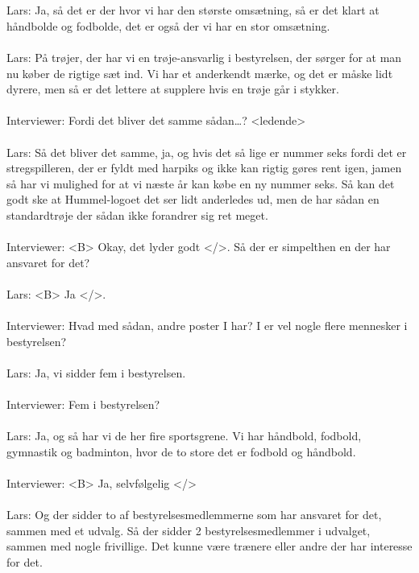 \\\\
Lars: Ja, så det er der hvor vi har den største omsætning, så er det klart at håndbolde og fodbolde, det er også der vi har en stor omsætning.
\\\\
Lars: På trøjer, der har vi en trøje-ansvarlig i bestyrelsen, der sørger for at man nu køber de rigtige sæt ind. Vi har et anderkendt mærke, og det er måske lidt dyrere, men så er det lettere at supplere hvis en trøje går i stykker.
\\\\
Interviewer: Fordi det bliver det samme sådan…? <ledende>
\\\\
Lars: Så det bliver det samme, ja, og hvis det så lige er nummer seks fordi det er stregspilleren, der er fyldt med harpiks og ikke kan rigtig gøres rent igen, jamen så har vi mulighed for at vi næste år kan købe en ny nummer seks. Så kan det godt ske at Hummel-logoet det ser lidt anderledes ud, men de har sådan en standardtrøje der sådan ikke forandrer sig ret meget.
\\\\
Interviewer: <B> Okay, det lyder godt </>. Så der er simpelthen en der har ansvaret for det?
\\\\
Lars: <B> Ja </>.
\\\\
Interviewer: Hvad med sådan, andre poster I har? I er vel nogle flere mennesker i bestyrelsen?
\\\\
Lars: Ja, vi sidder fem i bestyrelsen.
\\\\
Interviewer: Fem i bestyrelsen?
\\\\
Lars: Ja, og så har vi de her fire sportsgrene. Vi har håndbold, fodbold, gymnastik og badminton, hvor de to store det er fodbold og håndbold.
\\\\
Interviewer: <B> Ja, selvfølgelig </>
\\\\
Lars: Og der sidder to af bestyrelsesmedlemmerne som har ansvaret for det, sammen med et udvalg. Så der sidder 2 bestyrelsesmedlemmer i udvalget, sammen med nogle frivillige. Det kunne være trænere eller andre der har interesse for det.
\\\\

